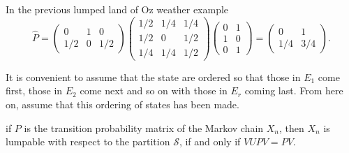 \documentclass[12pt]{article}
\begin{document}
\begin{example}
    In the previous lumped land of Oz weather example
    \[
        \hat{P} =
        \begin{pmatrix}
            0 & 1 & 0 \\
            1/2 & 0 & 1/2
        \end{pmatrix}
        \begin{pmatrix}
            1/2 & 1/4 & 1/4 \\
            1/2 & 0 & 1/2 \\
            1/4 & 1/4 & 1/2
        \end{pmatrix}
        \begin{pmatrix}
            0 & 1 \\
            1 & 0 \\
            0 & 1
        \end{pmatrix}
        =
        \begin{pmatrix}
            0 & 1 \\
            1/4 & 3/4
        \end{pmatrix}
        .
    \]
\end{example}

It is convenient to assume that the state are ordered so that those in \(
E_1 \) come first, those in \( E_{2} \) come next and so on with those
in \( E_r \) coming last.  From here on, assume that this ordering of
states has been made.

\begin{theorem}
    if \( P \) is the transition probability matrix of the Markov chain \(
    X_n \), then \( X_n \) is lumpable with respect to the partition \(
    \mathcal{S} \), if and only if \( VUPV = PV \).
\end{theorem}
\end{document}
